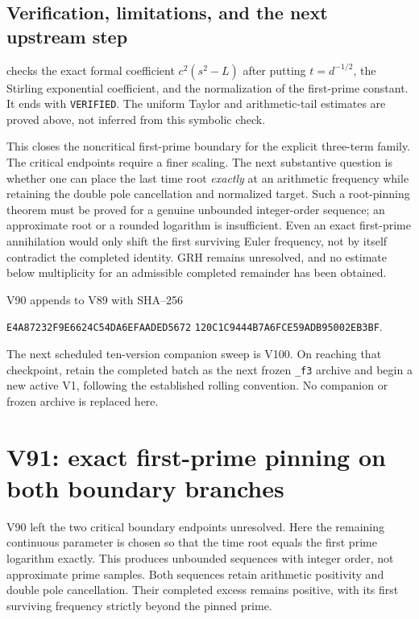 \documentclass[11pt]{article}
\theoremstyle{definition}
\theoremstyle{remark}
\begin{document}
\subsection*{Verification, limitations, and the next upstream step}

 checks the exact
formal coefficient \(c^2(s^2-L)\) after putting \(t=d^{-1/2}\),
the Stirling exponential coefficient, and the normalization of the
first-prime constant.  It ends with \texttt{VERIFIED}.  The uniform
Taylor and arithmetic-tail estimates are proved above, not inferred
from this symbolic check.

This closes the noncritical first-prime boundary for the explicit
three-term family.  The critical endpoints require a finer scaling.
The next substantive question is whether one can place the last time
root \emph{exactly} at an arithmetic frequency while retaining the
double pole cancellation and normalized target.  Such a root-pinning
theorem must be proved for a genuine unbounded integer-order sequence;
an approximate root or a rounded logarithm is insufficient.  Even an
exact first-prime annihilation would only shift the first surviving
Euler frequency, not by itself contradict the completed identity.
GRH remains unresolved, and no estimate below multiplicity for an
admissible completed remainder has been obtained.

V90 appends to V89 with SHA--256
\begin{center}
\texttt{E4A87232F9E6624C54DA6EFAADED5672}\allowbreak
\texttt{120C1C9444B7A6FCE59ADB95002EB3BF}.
\end{center}
The next scheduled ten-version companion sweep is V100.  On reaching
that checkpoint, retain the completed batch as the next frozen
\texttt{\_f3} archive and begin a new active V1, following the established
rolling convention.  No companion or frozen archive is replaced here.
\endgroup

\clearpage
\section{V91: exact first-prime pinning on both boundary branches}
\label{sec:f2v91-pinning}
\begingroup
\setcounter{equation}{0}
\renewcommand{\theequation}{N91.\arabic{equation}}
\renewcommand{\theHequation}{f2v91.\arabic{equation}}

V90 left the two critical boundary endpoints unresolved.  Here the
remaining continuous parameter is chosen so that the time root equals
the first prime logarithm exactly.  This produces unbounded sequences
with integer order, not approximate prime samples.  Both sequences
retain arithmetic positivity and double pole cancellation.  Their
completed excess remains positive, with its first surviving frequency
strictly beyond the pinned prime.
\end{document}
